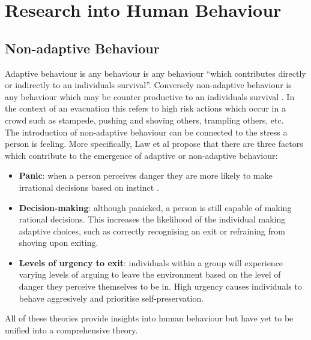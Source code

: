 %

\section{Research into Human Behaviour}
\subsection{Non-adaptive Behaviour}
Adaptive behaviour is any behaviour is any behaviour ``which contributes directly or indirectly to an individuals survival''.
Conversely non-adaptive behaviour is any behaviour which may be counter productive to an individuals survival \cite{AdaptiveBehaviourWiki}.
In the context of an evacuation this refers to high risk actions which occur in a crowd such as stampede, pushing and shoving others,
trampling others, etc.\\
The introduction of non-adaptive behaviour can be connected to the stress a person is feeling. More specifically, Law et al \cite{CIFEResearchProposal} propose that there are three factors which contribute to the emergence of adaptive or non-adaptive behaviour:
\begin{itemize}
  \item{\textbf{Panic}: when a person perceives danger they are more likely to make irrational decisions based on instinct \cite{PanMASSEgressThesis}.}
  \item{\textbf{Decision-making}: although panicked, a person is still capable of making rational decisions. This increases the likelihood of the individual making adaptive choices, such as correctly recognising an exit or refraining from shoving upon exiting.}
  \item{\textbf{Levels of urgency to exit}: individuals within a group will experience varying levels of arguing to leave the environment based on the level of danger they perceive themselves to be in. High urgency causes individuals to behave aggresively and prioritise self-preservation.}
\end{itemize}
All of these theories provide insights into human behaviour but have yet to be unified into a comprehensive theory.

